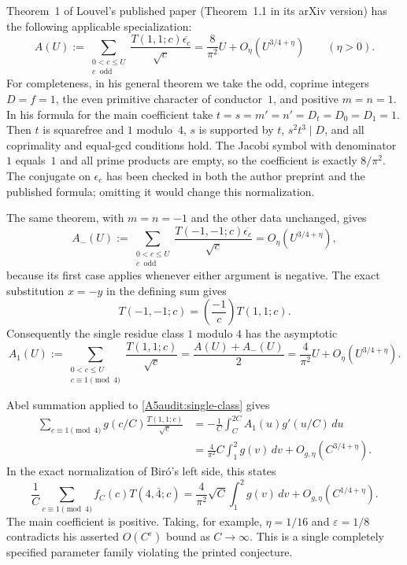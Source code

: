 Theorem~1 of Louvel's published paper
\cite[p.~525]{A5Louvel2012} (Theorem~1.1 in its arXiv version)
has the following applicable specialization:
\begin{equation}\label{A5audit:louvel-specialization}
 A(U):=\sum_{\substack{0<c\leq U\\c\ \text{ odd}}}
 \frac{T(1,1;c)\overline{\epsilon_c}}{\sqrt c}
 =\frac8{\pi^2}U+O_\eta(U^{3/4+\eta})
 \qquad(\eta>0).
\end{equation}
For completeness, in his general theorem we take the odd, coprime
integers $D=f=1$, the even primitive character of conductor~$1$,
and positive $m=n=1$.  In his formula for the main coefficient take
$t=s=m'=n'=D_t=D_0=D_1=1$.
Then $t$ is squarefree and $1$ modulo~$4$, $s$ is supported by $t$,
$s^2t^3\mid D$, and all coprimality and equal-gcd conditions hold.
The Jacobi symbol with denominator~$1$ equals~$1$ and all prime
products are empty, so the coefficient is exactly $8/\pi^2$.
The conjugate on $\epsilon_c$ has been checked in both the author
preprint and the published formula; omitting it would change this
normalization.

The same theorem, with $m=n=-1$ and the other data unchanged, gives
\[
 A_-(U):=\sum_{\substack{0<c\leq U\\c\ \text{ odd}}}
 \frac{T(-1,-1;c)\overline{\epsilon_c}}{\sqrt c}
 =O_\eta(U^{3/4+\eta}),
\]
because its first case applies whenever either argument is negative.
The exact substitution $x=-y$ in the defining sum gives
\[
 T(-1,-1;c)=\left(\frac{-1}{c}\right)T(1,1;c).
\]
Consequently the single residue class $1$ modulo $4$ has the asymptotic
\begin{equation}\label{A5audit:single-class}
 A_1(U):=\sum_{\substack{0<c\leq U\\c\equiv1\pmod4}}
 \frac{T(1,1;c)}{\sqrt c}
 =\frac{A(U)+A_-(U)}2
 =\frac4{\pi^2}U+O_\eta(U^{3/4+\eta}).
\end{equation}

Abel summation applied to \eqref{A5audit:single-class} gives
\begin{align*}
 \sum_{c\equiv1\pmod4} g(c/C)
       \frac{T(1,1;c)}{\sqrt c}
 &=-\frac1C\int_C^{2C} A_1(u)g'(u/C)\,du\\
 &=\frac4{\pi^2}C\int_1^2g(v)\,dv
       +O_{g,\eta}(C^{3/4+\eta}).
\end{align*}
In the exact normalization of Bir\'o's left side, this states
\[
 \frac1C\sum_{c\equiv1\pmod4}f_C(c)T(4,\bar4;c)
 =\frac4{\pi^2}\sqrt C\int_1^2g(v)\,dv
 +O_{g,\eta}(C^{1/4+\eta}).
\]
The main coefficient is positive.  Taking, for example,
$\eta=1/16$ and $\varepsilon=1/8$ contradicts his asserted
$O(C^\varepsilon)$ bound as $C\to\infty$.
This is a single completely specified parameter family violating the
printed conjecture.


